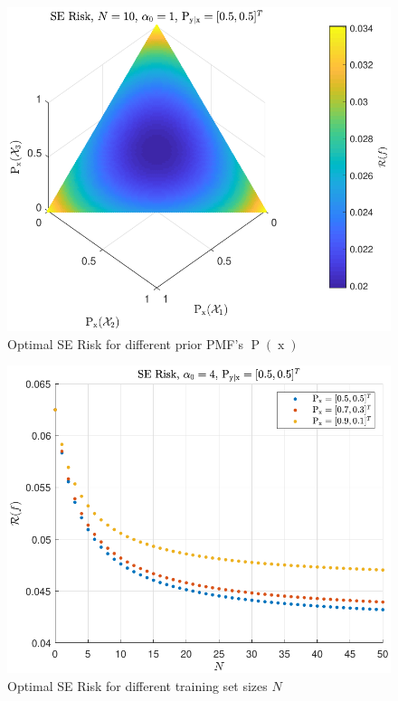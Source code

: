 \documentclass[12pt]{article}
\DeclareMathOperator{\xrm}{\mathrm{x}}
\DeclareMathOperator{\Prm}{\mathrm{P}}
\begin{document}
\begin{figure}
\centering
\includegraphics[scale=1.0]{Risk_SE_Dir_IO_Px_N_10_a0_1.pdf}
\caption{Optimal SE Risk for different prior PMF's $\Prm(\xrm)$}
\label{fig:Risk_SE_Dir_IO_Px_N_10_a0_1}
\end{figure}

\begin{figure}
\centering
\includegraphics[scale=1.0]{Risk_SE_Dir_IO_N_leg_Px.pdf}
\caption{Optimal SE Risk for different training set sizes $N$}
\label{fig:Risk_SE_Dir_IO_N_leg_Px}
\end{figure}
\end{document}
